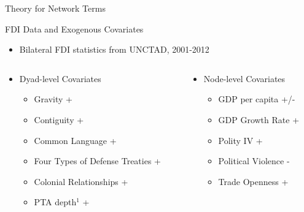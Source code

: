 \documentclass{beamer}
\begin{document}
\begin{frame}{Theory for Network Terms}
\end{frame}

\begin{frame}{FDI Data and Exogenous Covariates}

\begin{itemize}
\item{Bilateral FDI statistics from UNCTAD, 2001-2012}
\end{itemize}

\begin{columns}[T]
    \begin{column}{.5\textwidth}
\begin{itemize}
\item{Dyad-level Covariates}
\begin{itemize}
\item{Gravity +} 
\item{Contiguity +} 
\item{Common Language +} 
\item{Four Types of Defense Treaties +}  
\item{Colonial Relationships +}
 \item{PTA depth$^{1}$ + }
\end{itemize}
\end{itemize}
    \end{column}
    \begin{column}{.5\textwidth}
\begin{itemize}
\item{Node-level Covariates}
\begin{itemize}
\item{GDP per capita +/-} 
\item{GDP Growth Rate +} 
\item {Polity IV +} 
\item{Political Violence - } 
\item{Trade Openness +}
\end{itemize}
\end{itemize}
        \end{column}
  \end{columns}
 
  


\end{frame}
\end{document}
